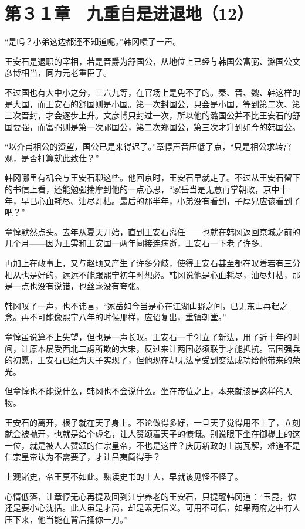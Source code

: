 \section{第３１章　九重自是进退地（12）}

“是吗？小弟这边都还不知道呢。”韩冈啧了一声。

王安石是退职的宰相，若是晋爵为舒国公，从地位上已经与韩国公富弼、潞国公文彦博相当，同为元老重臣了。

不过国也有大中小之分，三六九等，在官场上是免不了的。秦、晋、魏、韩这样的是大国，而王安石的舒国则是小国。第一次封国公，只会是小国，等到第二次、第三次晋封，才会逐步上升。文彦博只封过一次，所以他的潞国公并不比王安石的舒国要强，而富弼则是第一次祁国公，第二次郑国公，第三次才升到如今的韩国公。

“以介甫相公的资望，国公已是来得迟了。”章惇声音压低了点，“只是相公求转宫观，是否打算就此致仕？”

韩冈哪里有机会与王安石聊这些。他回京时，王安石早就走了。不过从王安石留下的书信上看，还能勉强揣摩到他的一点心思，“家岳当是无意再掌朝政，京中十年，早已心血耗尽、油尽灯枯。最后的那半年，小弟没有看到，子厚兄应该看到了吧？”

章惇默然点头。去年从夏天开始，直到王安石离任——也就在韩冈返回京城之前的几个月——因为王雱和王安国一两年间接连病逝，王安石一下老了许多。

再加上在政事上，又与赵顼又产生了许多分歧，使得王安石甚至都在叹着若有三分相从也是好的，远远不能跟熙宁初年时想必。韩冈说他是心血耗尽，油尽灯枯，那是一点也没有说错，也丝毫没有夸张。

韩冈叹了一声，也不讳言，“家岳如今当是心在江湖山野之间，已无东山再起之念。再不可能像熙宁八年的时候那样，应诏复出，重镇朝堂。”

章惇虽说算不上失望，但也是一声长叹。王安石一手创立了新法，用了近十年的时间，让原本屡受西北二虏所欺的大宋，反过来让两国必须联手才能抵抗。富国强兵的初愿，王安石已经为天子实现了，但他现在却无法享受到变法成功给他带来的荣光。

但章惇也不能说什么，韩冈也不会说什么。坐在帝位之上，本来就该是这样的人物。

王安石的离开，根子就在天子身上。不论做得多好，一旦天子觉得用不上了，立刻就会被抛开，也就是给个虚名，让人赞颂着天子的慷慨。别说眼下坐在御榻上的这一位，就是被人人赞颂的仁宗皇帝，不也是这样？庆历新政的土崩瓦解，难道不是仁宗皇帝认为不需要了，才让吕夷简得手？

上观诸史，帝王莫不如此。熟读史书的士人，早就该见怪不怪了。

心情低落，让章惇无心再提及回到江宁养老的王安石，只提醒韩冈道：“玉昆，你还是要小心沈括。此人虽是才高，却是素无信义。可用不可信，如果两府之中有人压下来，他当能在背后捅你一刀。”

